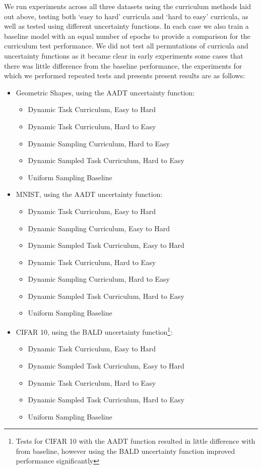 We run experiments across all three datasets using the curriculum methods laid out above, testing both `easy to hard' curricula and `hard to easy' curricula, as well as tested using different uncertainty functions. In each case we also train a baseline model with an equal number of epochs to provide a comparison for the curriculum test performance. We did not test all permutations of curricula and uncertainty functions as it became clear in early experiments some cases that there was little difference from the baseline performance, the experiments for which we performed repeated tests and presents present results are as follows:
\begin{itemize}
\item Geometric Shapes, using the AADT uncertainty function:
\begin{itemize}
\item{Dynamic Task Curriculum, Easy to Hard}
\item{Dynamic Task Curriculum, Hard to Easy}
\item{Dynamic Sampling Curriculum, Hard to Easy}
\item{Dynamic Sampled Task Curriculum, Hard to Easy}
\item{Uniform Sampling Baseline}
\end{itemize}
\item MNIST, using the AADT uncertainty function:
\begin{itemize}
\item{Dynamic Task Curriculum, Easy to Hard}
\item{Dynamic Sampling Curriculum, Easy to Hard}
\item{Dynamic Sampled Task Curriculum, Easy to Hard}
\item{Dynamic Task Curriculum, Hard to Easy}
\item{Dynamic Sampling Curriculum, Hard to Easy}
\item{Dynamic Sampled Task Curriculum, Hard to Easy}
\item{Uniform Sampling Baseline}
\end{itemize}
\item CIFAR 10, using the BALD uncertainty function\footnote {Tests for CIFAR 10 with the AADT function resulted in little difference with from baseline, however using the BALD uncertainty function improved performance significantly}:
\begin{itemize}
\item{Dynamic Task Curriculum, Easy to Hard}
\item{Dynamic Sampled Task Curriculum, Easy to Hard}
\item{Dynamic Task Curriculum, Hard to Easy}
\item{Dynamic Sampled Task Curriculum, Hard to Easy}
\item{Uniform Sampling Baseline}
\end{itemize}
\end{itemize}


